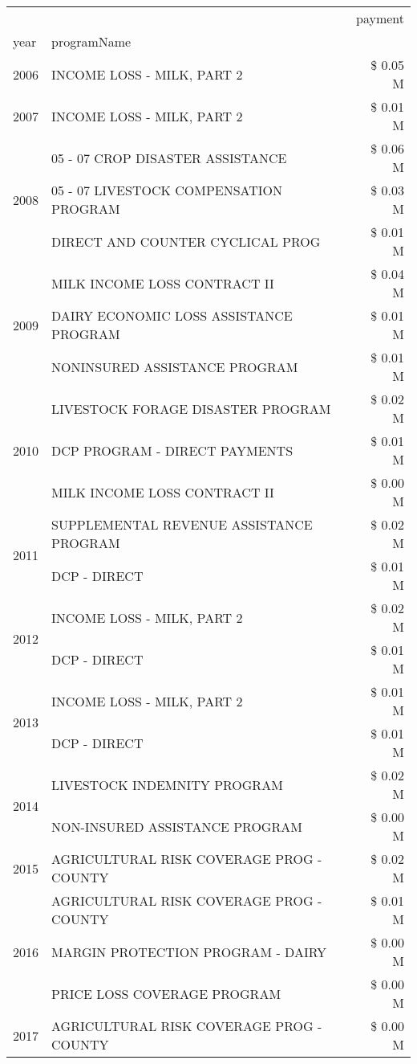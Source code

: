 \begin{tabular}{llr}
\toprule
 &  & payment \\
year & programName &  \\
\midrule
2006 & INCOME LOSS - MILK, PART 2 & \$ 0.05 M \\
\cline{1-3}
2007 & INCOME LOSS - MILK, PART 2 & \$ 0.01 M \\
\cline{1-3}
\multirow[t]{3}{*}{2008} & 05 - 07 CROP DISASTER ASSISTANCE & \$ 0.06 M \\
 & 05 - 07 LIVESTOCK COMPENSATION PROGRAM & \$ 0.03 M \\
 & DIRECT AND COUNTER CYCLICAL PROG & \$ 0.01 M \\
\cline{1-3}
\multirow[t]{3}{*}{2009} & MILK INCOME LOSS CONTRACT II & \$ 0.04 M \\
 & DAIRY ECONOMIC LOSS ASSISTANCE PROGRAM & \$ 0.01 M \\
 & NONINSURED ASSISTANCE PROGRAM & \$ 0.01 M \\
\cline{1-3}
\multirow[t]{3}{*}{2010} & LIVESTOCK FORAGE DISASTER  PROGRAM & \$ 0.02 M \\
 & DCP PROGRAM - DIRECT PAYMENTS & \$ 0.01 M \\
 & MILK INCOME LOSS CONTRACT II & \$ 0.00 M \\
\cline{1-3}
\multirow[t]{2}{*}{2011} & SUPPLEMENTAL REVENUE ASSISTANCE PROGRAM & \$ 0.02 M \\
 & DCP - DIRECT & \$ 0.01 M \\
\cline{1-3}
\multirow[t]{2}{*}{2012} & INCOME LOSS - MILK, PART 2 & \$ 0.02 M \\
 & DCP - DIRECT & \$ 0.01 M \\
\cline{1-3}
\multirow[t]{2}{*}{2013} & INCOME LOSS - MILK, PART 2 & \$ 0.01 M \\
 & DCP - DIRECT & \$ 0.01 M \\
\cline{1-3}
\multirow[t]{2}{*}{2014} & LIVESTOCK INDEMNITY PROGRAM & \$ 0.02 M \\
 & NON-INSURED ASSISTANCE PROGRAM & \$ 0.00 M \\
\cline{1-3}
2015 & AGRICULTURAL RISK COVERAGE PROG - COUNTY & \$ 0.02 M \\
\cline{1-3}
\multirow[t]{3}{*}{2016} & AGRICULTURAL RISK COVERAGE PROG - COUNTY & \$ 0.01 M \\
 & MARGIN PROTECTION PROGRAM - DAIRY & \$ 0.00 M \\
 & PRICE LOSS COVERAGE PROGRAM & \$ 0.00 M \\
\cline{1-3}
\multirow[t]{2}{*}{2017} & AGRICULTURAL RISK COVERAGE PROG - COUNTY & \$ 0.00 M \\

\end{tabular}
